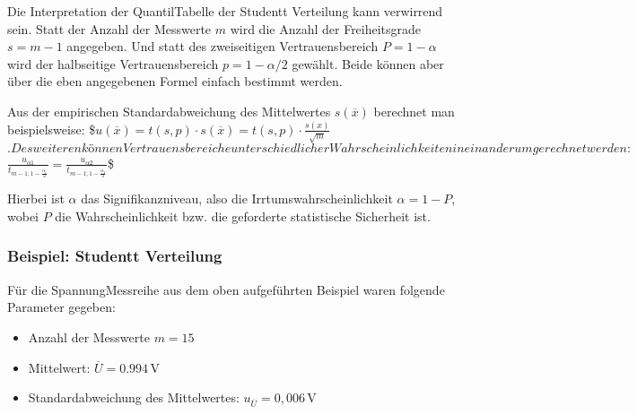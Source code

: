 \documentclass[letterpaper,10pt,english]{jupyterBook}
\begin{document}
\sphinxAtStartPar
{}

\sphinxAtStartPar
Die Interpretation der Quantil\sphinxhyphen{}Tabelle der Student\sphinxhyphen{}t Verteilung kann verwirrend sein. Statt der Anzahl der Messwerte \(m\) wird die Anzahl der Freiheitsgrade \(s = m-1\) angegeben. Und statt des zweiseitigen Vertrauensbereich \(P = 1-\alpha\) wird der halbseitige Vertrauensbereich \(p = 1-\alpha/2\) gewählt. Beide  können aber über die eben angegebenen Formel einfach bestimmt werden.

\sphinxAtStartPar
Aus der empirischen Standardabweichung des Mittelwertes \(s(\overline x)\) berechnet man beispielsweise:
\$\(u(\overline x) = t(s,p)\cdot s(\overline x) = t(s,p)\cdot \frac{s(x)}{\sqrt{m}}\)\(.
Desweiteren können Vertrauensbereiche unterschiedlicher Wahrscheinlichkeiten ineinander umgerechnet werden:
\)\(\frac{u_{\alpha 1}}{t_{m-1; 1-\frac{\alpha_1}{2}}} =  \frac{u_{\alpha 2}}{t_{m-1; 1-\frac{\alpha_2}{2}}}\)\$

\sphinxAtStartPar
Hierbei ist \(\alpha\) das Signifikanzniveau, also die Irrtumswahrscheinlichkeit \(\alpha = 1-P\), wobei \(P\) die Wahrscheinlichkeit bzw. die geforderte statistische Sicherheit ist.


\subsubsection{Beispiel: Student\sphinxhyphen{}t Verteilung }
\label{\detokenize{content/1_Mittelwert_StdAbw:beispiel-student-t-verteilung-a-id-subsec-beispiel-student-t-verteilung-a}}
\sphinxAtStartPar
Für die Spannung\sphinxhyphen{}Messreihe aus dem oben aufgeführten Beispiel waren folgende Parameter gegeben:
\begin{itemize}
\item {} 
\sphinxAtStartPar
Anzahl der Messwerte \(m=15\)

\item {} 
\sphinxAtStartPar
Mittelwert: \(\overline U = 0.994\,\mathrm{V}\)

\item {} 
\sphinxAtStartPar
Standardabweichung des Mittelwertes: \( u_{\overline U} = 0,006\,\mathrm V \)

\end{itemize}
\end{document}
